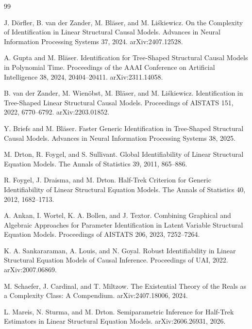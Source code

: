 \documentclass{article}
\begin{document}
\begin{thebibliography}{99}

   J. Dörfler, B. van der Zander, M. Bläser, and M. Liśkiewicz. On the Complexity of Identification in Linear Structural Causal Models. Advances in Neural Information Processing Systems 37, 2024. arXiv:2407.12528.

   A. Gupta and M. Bläser. Identification for Tree-Shaped Structural Causal Models in Polynomial Time. Proceedings of the AAAI Conference on Artificial Intelligence 38, 2024, 20404--20411. arXiv:2311.14058.

   B. van der Zander, M. Wienöbst, M. Bläser, and M. Liśkiewicz. Identification in Tree-Shaped Linear Structural Causal Models. Proceedings of AISTATS 151, 2022, 6770--6792. arXiv:2203.01852.

   Y. Briefs and M. Bläser. Faster Generic Identification in Tree-Shaped Structural Causal Models. Advances in Neural Information Processing Systems 38, 2025.

   M. Drton, R. Foygel, and S. Sullivant. Global Identifiability of Linear Structural Equation Models. The Annals of Statistics 39, 2011, 865--886.

   R. Foygel, J. Draisma, and M. Drton. Half-Trek Criterion for Generic Identifiability of Linear Structural Equation Models. The Annals of Statistics 40, 2012, 1682--1713.

   A. Ankan, I. Wortel, K. A. Bollen, and J. Textor. Combining Graphical and Algebraic Approaches for Parameter Identification in Latent Variable Structural Equation Models. Proceedings of AISTATS 206, 2023, 7252--7264.

   K. A. Sankararaman, A. Louis, and N. Goyal. Robust Identifiability in Linear Structural Equation Models of Causal Inference. Proceedings of UAI, 2022. arXiv:2007.06869.

   M. Schaefer, J. Cardinal, and T. Miltzow. The Existential Theory of the Reals as a Complexity Class: A Compendium. arXiv:2407.18006, 2024.

   L. Mareis, N. Sturma, and M. Drton. Semiparametric Inference for Half-Trek Estimators in Linear Structural Equation Models. arXiv:2606.26931, 2026.

\end{thebibliography}
\end{document}

